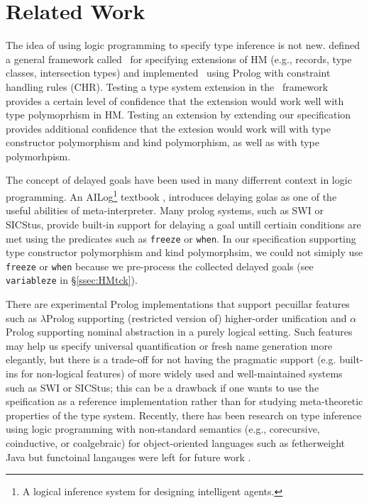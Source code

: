 \section{Related Work}\label{sec:relwork}
The idea of using logic programming to specify type inference is not new.
\citet*{HMX99} defined a general framework called \HMX\ for specifying
extensions of HM (e.g., records, type classes, intersection types)
and \citet{tyinferCHR02} implemented \HMX\ using Prolog with
constraint handling rules (CHR). Testing a type system extension
in the \HMX\ framework provides a certain level of confidence that the extension
would work well with type polymoprhism in HM. Testing an extension by
extending our specification provides additional confidence that the extesion
would work will with type constructor polymorphism and kind polymorphism,
as well as with type polymorhpism.

The concept of delayed goals have been used in many differrent context
in logic programming. An AILog\footnote{A logical inference system for designing
	 intelligent agents.} textbook \cite{AILogTextBook},
introduces delaying golas as one of the useful abilities of meta-interpreter.
Many prolog systems, such as SWI or SICStus, provide built-in support for
delaying a goal untill certiain conditions are met using the predicates
such as \verb|freeze| or \verb|when|. In our specification supporting
type constructor polymorphism and kind polymorphsim, we could not
simiply use \verb|freeze| or \verb|when| because we pre-process
the collected delayed goals (see \verb|variableze| in \S\ref{ssec:HMtck}).


There are experimental Prolog implementations that support pecuillar features
such as
$\lambda$Prolog supporting (restricted version of) higher-order unification
and 
$\alpha$Prolog supporting nominal abstraction in a purely logical setting.
Such features may help us specify universal quantification or fresh name
generation more elegantly, but there is a trade-off for not having the
pragmatic support (e.g. built-ins for non-logical features) of more widely used
and well-maintained systems such as SWI or SICStus; this can be a drawback if
one wants to use the speification as a reference implementation rather than
for studying meta-theoretic properties of the type system.
Recently, there has been research on type inference using logic programming
with non-standard semantics (e.g., corecursive, coinductive, or coalgebraic)
for object-oriented languages such as fetherweight Java but functoinal langauges
were left for future work \cite{AnconaLZ08}.

